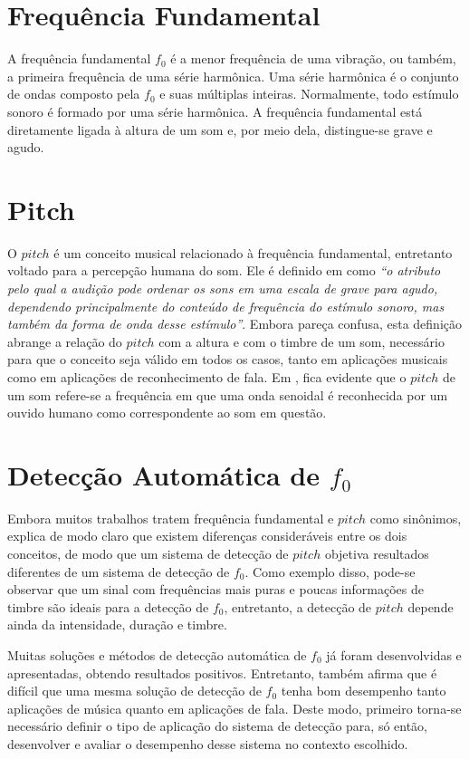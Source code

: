 \section{Frequência Fundamental}

A frequência fundamental $f_0$ é a menor frequência de uma vibração, ou também, a primeira frequência de uma série harmônica. Uma série harmônica é o conjunto de ondas composto pela $f_0$ e suas múltiplas inteiras. Normalmente, todo estímulo sonoro é formado por uma série harmônica. A frequência fundamental está diretamente ligada à altura de um som e, por meio dela, distingue-se grave e agudo.


\section{Pitch}


O $pitch$ é um conceito musical relacionado à frequência fundamental, entretanto voltado para a percepção humana do som. Ele é definido em \cite{hartmann1996} como \textit{``o atributo pelo qual a audição pode ordenar os sons em uma escala de grave para agudo, dependendo principalmente do conteúdo de frequência do estímulo sonoro, mas também da forma de onda desse estímulo''}. Embora pareça confusa, esta definição abrange a relação do $pitch$ com a altura e com o timbre de um som, necessário para que o conceito seja válido em todos os casos, tanto em aplicações musicais como em aplicações de reconhecimento de fala. Em \cite{klapuri2006}, fica evidente que o $pitch$ de um som refere-se a frequência em que uma onda senoidal é reconhecida por um ouvido humano como correspondente ao som em questão.


\section{Detecção Automática de $f_0$}

Embora muitos trabalhos tratem frequência fundamental e $pitch$ como sinônimos, \cite{gerhard2003} explica de modo claro que existem diferenças consideráveis entre os dois conceitos, de modo que um sistema de detecção de $pitch$ objetiva resultados diferentes de um sistema de detecção de $f_0$. Como exemplo disso, pode-se observar que um sinal com frequências mais puras e poucas informações de timbre são ideais para a detecção de $f_0$, entretanto, a detecção de $pitch$ depende ainda da intensidade, duração e timbre.


Muitas soluções e métodos de detecção automática de $f_0$ já foram desenvolvidas e apresentadas, obtendo resultados positivos. Entretanto, \cite{gerhard2003} também afirma que é difícil que uma mesma solução de detecção de $f_0$ tenha bom desempenho tanto aplicações de música quanto em aplicações de fala. Deste modo, primeiro torna-se necessário definir o tipo de aplicação do sistema de detecção para, só então, desenvolver e avaliar o desempenho desse sistema no contexto escolhido.


